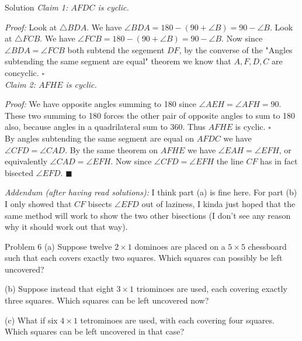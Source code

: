 \documentclass{article}
\begin{document}
\begin{solution}{Solution}
\textit{Claim 1: $AFDC$ is cyclic.}
\vspace{0.2cm}

\textit{Proof:} Look at $\triangle BDA$. We have
$\angle BDA = 180 - (90 + \angle B) = 90 - \angle B$. Look at
$\triangle FCB$. We have
$\angle FCB = 180 - (90 + \angle B) = 90 - \angle B$. Now since
$\angle BDA = \angle FCB$ both subtend the segement $DF$, by the converse
of the "Angles subtending the same segment are equal" theorem we know that
$A,F,D,C$ are concyclic. $\square$ \\

\textit{Claim 2: $AFHE$ is cyclic.} \vspace{0.2cm}

\textit{Proof:} We have opposite angles summing to 180 since
$\angle AEH = \angle AFH = 90$. These two summing to 180 forces the other
pair of opposite angles to sum to 180 also, because angles in a
quadrilateral sum to 360. Thus $AFHE$ is cyclic. $\square$ \\

By angles subtending the same segment are equal on $AFDC$ we have
$\angle CFD = \angle CAD$. By the same theorem on $AFHE$ we have
$\angle EAH = \angle EFH$, or equivalently $\angle CAD = \angle EFH$.
Now since $\angle CFD = \angle EFH$ the line $CF$
has in fact bisected $\angle EFD$. $\blacksquare$
\\

\hline
\vspace{0.2cm}

\textit{Addendum (after having read solutions):} I think part (a) is fine
here. For part (b) I only showed that $CF$ bisects $\angle EFD$ out
of laziness, I kinda just hoped that the same method will work to show
the two other bisections (I don't see any reason why it should work out
that way).
\end{solution}
\newpage

\begin{problem}{Problem 6}
(a) Suppose twelve $2 \times 1$ dominoes are placed on a $5 \times 5$
chessboard such that each covers exactly two squares. Which squares can
possibly be left uncovered? \vspace{0.2cm}

(b) Suppose instead that eight $3 \times 1$ triominoes are used, each
covering exactly three squares. Which squares can be left uncovered now?
\vspace{0.2cm}

(c) What if six $4 \times 1$ tetrominoes are used, with each covering
four squares. Which squares can be left uncovered in that case?
\end{problem}
\end{document}
